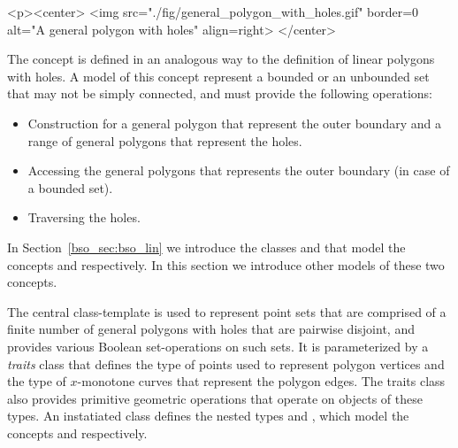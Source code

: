 \lcTex{%
  \setlength{\widthRight}{1.4cm}
  \setlength{\widthLeft}{\widthLineReal}
  \addtolength{\widthLeft}{-\widthRight}
  \begin{minipage}{\widthLeft}
}
\label{fig:general_polygon_with_holes}
\begin{ccHtmlOnly}
  <p><center>
    <img src="./fig/general_polygon_with_holes.gif" border=0 alt="A general polygon with holes" align=right>
  </center>
\end{ccHtmlOnly}
The concept  is defined in an analogous
way to the definition of linear polygons with holes. A model of this
concept represent a bounded or an unbounded set that may not be simply
connected, and must provide the following operations:
\begin{itemize}
\item Construction for a general polygon that represent the outer boundary
and a range of general polygons that represent the holes.
\item Accessing the general polygons that represents the outer boundary
(in case of a bounded set).
\item Traversing the holes.
\end{itemize}
In Section~\ref{bso_sec:bso_lin} we introduce the classes
 and  that model the concepts
 and 
respectively. In this section we introduce other models of these two
concepts.

The central class-template  is used to
represent point sets that are comprised of a finite number of general
polygons with holes that are pairwise disjoint, and provides various Boolean
set-operations on such sets. It is parameterized by a {\em traits}
class that defines the type of points used to represent polygon
vertices and the type of $x$-monotone curves that represent the
polygon edges. The traits class also provides primitive geometric
operations that operate on objects of these types. An instatiated
 class defines the nested types 
 and
, which model
the concepts  and
 respectively.

